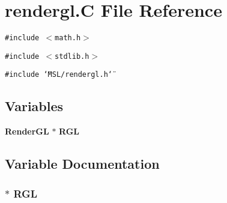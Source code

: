 \section{rendergl.C File Reference}
\label{rendergl_8C}
{\tt \#include $<$math.h$>$}\par
{\tt \#include $<$stdlib.h$>$}\par
{\tt \#include \char`\"{}MSL/rendergl.h\char`\"{}}\par
\subsection*{Variables}
\begin{CompactItemize}
\item 
{\bf Render\-GL} $\ast$ {\bf RGL}
\end{CompactItemize}


\subsection{Variable Documentation}
\subsubsection{$\ast$ RGL}\label{rendergl_8C_a0}


